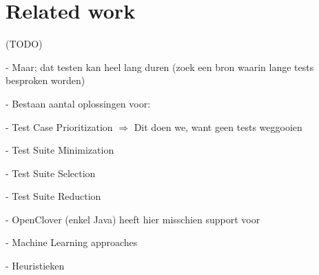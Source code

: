\chapter{Related work}

	

(TODO)

- Maar; dat testen kan heel lang duren (zoek een bron waarin lange tests besproken worden)

- Bestaan aantal oplossingen voor:

  - Test Case Prioritization $\Rightarrow$ Dit doen we, want geen tests weggooien

- Test Suite Minimization

- Test Suite Selection

- Test Suite Reduction

- OpenClover (enkel Java) heeft hier misschien support voor

- Machine Learning approaches

- Heuristieken